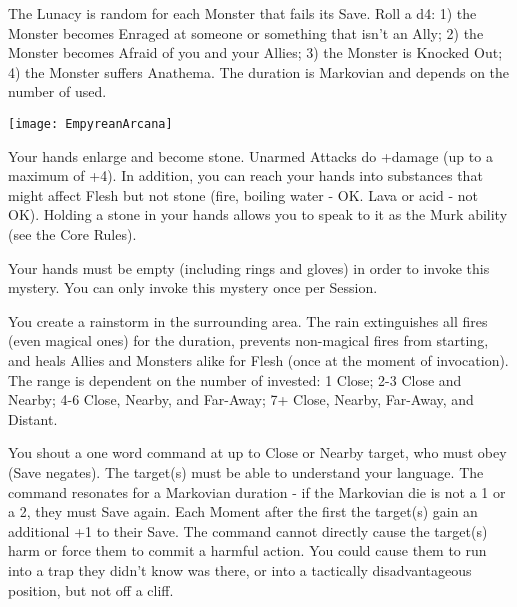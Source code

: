 The Lunacy is random for each Monster that fails its Save.  Roll a d4:  1) the Monster becomes Enraged at someone or something that isn't an Ally; 2) the Monster becomes Afraid of you and your Allies; 3) the Monster is Knocked Out; 4) the Monster suffers Anathema.  The duration is Markovian and depends on the number of \DICE used.

  \begin{center}
  \texttt{[image: EmpyreanArcana]}
  \end{center}


\MYSTERY [
  Name = Mountainhands,
  Link = arcana-mystery-mountainhands,
  Paradigm = Biomancy,
  Save = N,
  Duration = Session,
  Target = Self
]

Your hands enlarge and become stone.  Unarmed Attacks do +\DICE damage (up to a maximum of +4).  In addition, you can reach your hands into substances that might affect Flesh but not stone (fire, boiling water - OK.  Lava or acid - not OK).  Holding a stone in your hands allows you to speak to it as the Murk ability (see the Core Rules). 

Your hands must be empty (including rings and gloves) in order to invoke this mystery. You can only invoke this mystery once per Session.

\MYSTERY [
  Name = Rainburst,
  Link = arcana-mystery-rainburst,
  Paradigm = Elements,
  Save = n/a,
  Duration = Combat or \SUM Minutes,
  Target = See Below
]

You create a rainstorm in the surrounding area.  The rain extinguishes all fires (even magical ones) for the duration, prevents non-magical fires from starting, and heals Allies and Monsters alike for \SUMDICE Flesh (once at the moment of invocation).  The range is dependent on the number of \DICE invested: 1 Close; 2-3 Close and Nearby; 4-6 Close, Nearby, and Far-Away; 7+ Close, Nearby, Far-Away, and Distant.

\MYSTERY [
  Name = Resonating Command,
  Link = arcana-mystery-resonating-command,
  Paradigm = Mind,
  Save = Y (neg.),
  Duration = Markovian,
  Target = Nearby Target(s)
]

You shout a one word command at up to \DICE Close or Nearby target, who must obey (Save negates).  The target(s) must be able to understand your language.  The command resonates for a Markovian duration - if the Markovian die is not a 1 or a 2, they must Save again.  Each Moment after the first the target(s) gain an additional +1 to their Save.  The command cannot directly cause the target(s) harm or force them to commit a harmful action.  You could cause them to run into a trap they didn't know was there, or into a tactically disadvantageous position, but not off a cliff.

